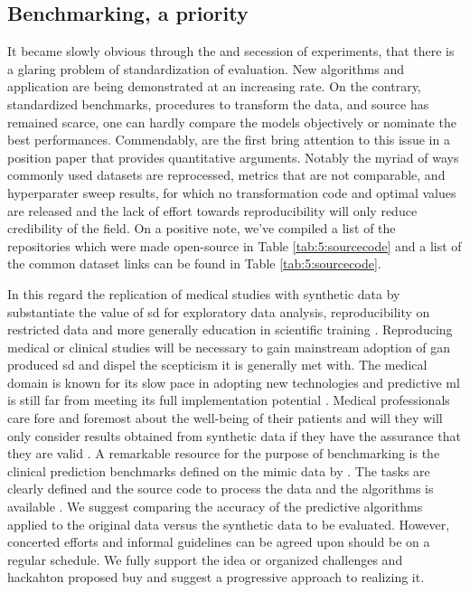 \subsection{Benchmarking, a priority}
It became slowly obvious through the and secession of experiments, that there is a glaring problem of standardization of evaluation. New algorithms and application are being demonstrated at an increasing rate. On the contrary, standardized benchmarks, procedures to transform the data, and source has remained scarce, one can hardly compare the models objectively or nominate the best performances. Commendably, \citeauthor{Camino2020bench} are the first bring attention to this issue in a position paper that provides quantitative arguments. Notably the myriad of ways commonly used datasets are reprocessed, metrics that are not comparable, and hyperparater sweep results, for which no transformation code and optimal values are released and the lack of effort towards reproducibility will only reduce credibility of the field. On a positive note, we've compiled a list of the repositories which were made open-source in Table \ref{tab:5:sourcecode} and a list of the common dataset links can be found in Table \ref{tab:5:sourcecode}.\par
In this regard the replication of medical studies with synthetic data by \citeauthor{Yale_2020} substantiate the value of \gls{sd} for exploratory data analysis, reproducibility on restricted data and more generally education in scientific training \cite{Reiner_Benaim2020-lx}. Reproducing medical or clinical studies will be necessary to gain mainstream adoption of \gls{gan} produced \gls{sd} and dispel the scepticism it is generally met with. The medical domain is known for its slow pace in adopting new technologies and predictive \gls{ml} is still far from meeting its full implementation potential \cite{Qayyum2020-ir}. Medical professionals care fore and foremost about the well-being of their patients and will they will only consider results obtained from synthetic data if they have the assurance that they are valid \cite{Rankin2020}.  A remarkable resource for the purpose of benchmarking is the clinical prediction benchmarks defined on the \gls{mimic} data by \citeauthor{harutyunyan_multitask_2019}. The tasks are clearly defined and the source code to process the data and the algorithms is available \cite{harutyunyan_multitask_2019}. We suggest comparing the accuracy of the predictive algorithms applied to the original data versus the synthetic data to be evaluated. However, concerted efforts and informal guidelines can be agreed upon should be on a regular schedule. We fully support the idea or organized challenges and hackahton proposed buy \cite{Camino2020bench} and suggest a progressive approach to realizing it.\par


